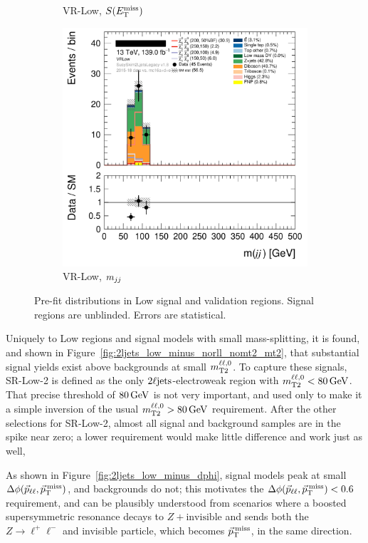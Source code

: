 \begin{figure}[tp]
\begin{subfigure}{0.48\textwidth}
\caption{VR-Low, $\metsig$}
\end{subfigure}
\hfill
\begin{subfigure}{0.48\textwidth}
\centering
\includegraphics[width=\textwidth]{figures/2ljets_def_mjj_VRLow.png}
\caption{VR-Low, $\mjj$}
\end{subfigure}
\caption[
Pre-fit distributions in Low signal and validation regions
]{%
Pre-fit distributions in Low signal and validation regions.
Signal regions are unblinded.
Errors are statistical.
}
\label{fig:2ljets_low_region}
\end{figure}

Uniquely to Low regions and signal models with small mass-splitting, it is
found, and shown in Figure~\ref{fig:2ljets_low_minus_norll_nomt2_mt2}, that
substantial signal yields exist above backgrounds at small $\mttwoll$.
To capture these signals, SR-Low-2 is defined as the only
$\twoljets$-electroweak region with $\mttwoll < 80\,\eV[G]$.
That precise threshold of $80\,\eV[G]$ is not very important, and used only to make it
a simple inversion of the usual $\mttwoll > 80\,\eV[G]$ requirement.
After the other selections for SR-Low-2, almost all signal and background
samples are in the spike near zero;
a lower requirement would make little difference and work just as well,

As shown in Figure~\ref{fig:2ljets_low_minus_dphi}, signal models peak at small
$\dphillmet$, and backgrounds do not; this motivates the $\dphillmet < 0.6$
requirement, and can be plausibly understood from scenarios where a boosted
supersymmetric resonance decays to $Z+\mathrm{invisible}$ and sends both
the $Z\to \ell^+\ell^-$ and invisible particle, which becomes
$\ptmiss$, in the same direction.

